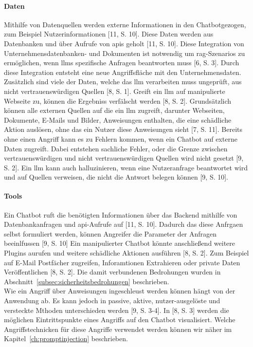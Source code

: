 \paragraph{Daten}

Mithilfe von Datenquellen werden externe Informationen in den Chatbotgezogen, zum Beispiel Nutzerinformationen [11, S. 10]. Diese Daten werden aus Datenbanken und über
Aufrufe von \ac{api}s geholt [11, S. 10]. Diese Integration von Unternehmensdatenbanken- und Dokumenten ist notwendig um \ac{rag}-Szenarios zu ermöglichen, wenn 
\ac{llm}s spezifische Anfragen beantworten muss [6, S. 3]. Durch diese Integration entsteht eine neue Angriffsfläche mit den Unternehmensdaten. Zusätzlich sind 
viele der Daten, welche das \ac{llm} verarbeiten muss ungeprüft, aus nicht vertrauenswürdigen Quellen [8, S. 1]. Greift ein \ac{llm} auf manipulierte Webseite zu, 
können die Ergebniss verfälscht werden [8, S. 2]. Grundsätzlich können alle externen Quellen auf die ein \ac{llm} zugreift, darunter Webseiten, Dokumente, E-Mails und 
Bilder, Anweisungen enthalten, die eine schädliche Aktion auslösen, ohne das ein Nutzer diese Anweisungen sieht [7, S. 11]. Bereits ohne einen Angriff kann es zu
Fehlern kommen, wenn ein Chatbot auf externe Daten zugreift. Dabei entstehen sachliche Fehler, oder die Grenze zwischen vertrauenswürdigen und nicht vertrauenswürdigen
Quellen wird nicht gesetzt [9, S. 2]. Ein \ac{llm} kann auch halluzinieren, wenn eine Nutzeranfrage beantwortet wird und auf Quellen verweisen, die nicht die 
Antwort belegen können [9, S. 10]. 

\paragraph{Tools}

Ein Chatbot ruft die benötigten Informationen über das Backend mithilfe von Datenbankanfragen und \ac{api}-Aufrufe auf [11, S. 10]. Dadurch das diese Anfrgaen 
selbst formuliert werden, können Angreifer die Parameter der Anfragen beeinlfussen [9, S. 10]
Ein manipulierter Chatbot könnte anschließend weitere Plugins aurufen und weitere schädliche Aktionen ausführen [8, S. 2]. Zum Beispiel auf E-Mail Postfächer zugreifen,
Inforamtionen Extrahieren oder private Daten Veröffentlichen [8, S. 2].
Die damit verbundenen Bedrohungen wurden in Abschnitt~\ref{subsec:sicherheitsbedrohungen} beschrieben. \\
Wie ein Angriff über Anweisungen ingeschleust werden können hängt von der Anwendung ab. Es kann jedoch in passive, aktive, nutzer-ausgelöste und versteckte Mthoden 
unterschieden werden [9, S. 3-4]. In [8, S. 3] werden die möglichen Eintrittspunkte eines Angriffs auf den Chatbot visualisiert. Welche Angriffstechnicken 
für diese Angriffe verwendet werden können wir näher im Kapitel~\ref{ch:promptinjection} beschrieben.

